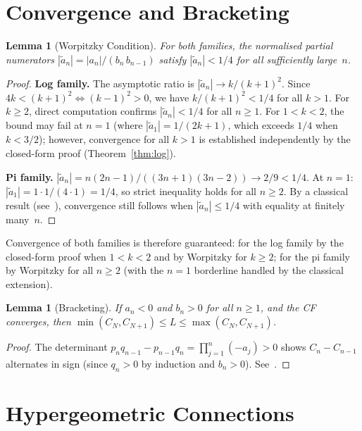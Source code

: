 \documentclass[11pt,a4paper]{article}
\theoremstyle{plain}
\newtheorem{lemma}[theorem]{Lemma}
\theoremstyle{remark}
\begin{document}
\section{Convergence and Bracketing}\label{sec:conv}

\begin{lemma}[Worpitzky Condition]\label{lem:work}
For both families, the normalised partial numerators
$|\tilde a_n| = |a_n|/(b_n\,b_{n-1})$ satisfy
$|\tilde a_n| < 1/4$ for all sufficiently large~$n$.
\end{lemma}
\begin{proof}
\textbf{Log family.}
The asymptotic ratio is $|\tilde a_n| \to k/(k{+}1)^2$.
Since $4k < (k{+}1)^2 \iff (k{-}1)^2 > 0$, we have
$k/(k{+}1)^2 < 1/4$ for all $k > 1$.
For $k \ge 2$, direct computation confirms $|\tilde a_n| < 1/4$
for all $n \ge 1$.
For $1 < k < 2$, the bound may fail at $n = 1$
(where $|\tilde a_1| = 1/(2k{+}1)$, which exceeds $1/4$
when $k < 3/2$); however, convergence for all $k > 1$ is
established independently by the closed-form proof
(Theorem~\ref{thm:log}).

\textbf{Pi family.}
$|\tilde a_n| = n(2n{-}1)/((3n{+}1)(3n{-}2)) \to 2/9 < 1/4$.
At $n = 1$: $|\tilde a_1| = 1\cdot1/(4\cdot1) = 1/4$, so strict inequality holds
for all $n \ge 2$.  By a classical result
(see~\cite[\S4.2]{lorentzen2008}), convergence still follows
when $|\tilde a_n| \le 1/4$ with equality at finitely many~$n$.
\end{proof}

\noindent Convergence of both families is therefore guaranteed:
for the log family by the closed-form proof when $1 < k < 2$ and
by Worpitzky for $k \ge 2$; for the pi family by Worpitzky
for all $n \ge 2$ (with the $n=1$ borderline handled by the
classical extension).

\begin{lemma}[Bracketing]\label{lem:bracket}
If $a_n < 0$ and $b_n > 0$ for all $n \ge 1$, and the CF converges,
then $\min(C_N,C_{N+1}) \le L \le \max(C_N,C_{N+1})$.
\end{lemma}
\begin{proof}
The determinant $p_nq_{n-1}-p_{n-1}q_n = \prod_{j=1}^n(-a_j)>0$
shows $C_n-C_{n-1}$ alternates in sign
(since $q_n>0$ by induction and $b_n>0$).
See~\cite[Theorem~4.35]{lorentzen2008}.
\end{proof}

\section{Hypergeometric Connections}\label{sec:hyper}
\end{document}
